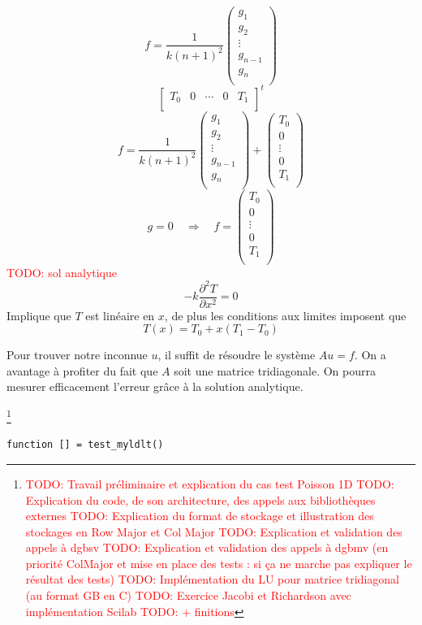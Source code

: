 \documentclass{article}
\begin{document}
\[
	f = \frac{1}{k(n+1)^2}
	\begin{pmatrix}
		g_1 \\ g_2 \\ \vdots \\ g_{n-1} \\ g_n \\
	\end{pmatrix}
\]
\[
	\begin{bmatrix}
		T_0 & 0 & \cdots & 0 & T_1 \\
	\end{bmatrix}^t
\]
\[
	f = \frac{1}{k(n+1)^2}
	\begin{pmatrix}
		g_1 \\ g_2 \\ \vdots \\ g_{n-1} \\ g_n \\
	\end{pmatrix} 
	+ \begin{pmatrix}
		T_0 \\ 0 \\ \vdots \\ 0 \\ T_1 \\
	\end{pmatrix}
\]
\[
	g = 0 \quad	\Longrightarrow \quad 
	f = \begin{pmatrix}
		T_0 \\ 0 \\ \vdots \\ 0 \\ T_1 \\
	\end{pmatrix}
\]
\textcolor{red}{TODO: sol analytique}
\[
	-k \frac{\partial^2 T}{\partial x^2} = 0
\]
	Implique que $T$ est linéaire en $x$, de plus les conditions aux limites imposent que 
\[
	T(x) = T_0 + x(T_1 - T_0)
\]

Pour trouver notre inconnue $u$, il suffit de résoudre le système \(Au = f\). On a avantage à profiter du fait que $A$ soit une matrice tridiagonale. On pourra mesurer efficacement l'erreur grâce à la solution analytique.



\footnote{
\textcolor{red}{TODO: Travail préliminaire et explication du cas test Poisson 1D}\newline
\textcolor{red}{TODO: Explication du code, de son architecture, des appels aux bibliothèques externes}\newline
\textcolor{red}{TODO: Explication du format de stockage et illustration des stockages en Row Major et Col Major}\newline
\textcolor{red}{TODO: Explication et validation des appels à dgbsv}\newline
\textcolor{red}{TODO: Explication et validation des appels à dgbmv (en priorité ColMajor et mise en place des tests : si ça ne marche pas expliquer le résultat des tests)}\newline
\textcolor{red}{TODO: Implémentation du LU pour matrice tridiagonal (au format GB en C)}\newline
\textcolor{red}{TODO: Exercice Jacobi et Richardson avec implémentation Scilab}\newline
\textcolor{red}{TODO: + finitions}}

\begin{verbatim}
function [] = test_myldlt()
\end{verbatim}
\end{document}
